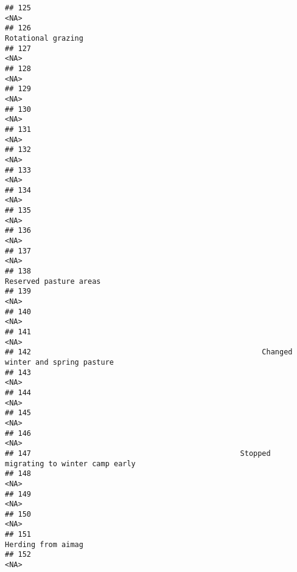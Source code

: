 \documentclass[
]{article}
\begin{document}
\begin{verbatim}
## 125                                                                                  <NA>
## 126                                                                    Rotational grazing
## 127                                                                                  <NA>
## 128                                                                                  <NA>
## 129                                                                                  <NA>
## 130                                                                                  <NA>
## 131                                                                                  <NA>
## 132                                                                                  <NA>
## 133                                                                                  <NA>
## 134                                                                                  <NA>
## 135                                                                                  <NA>
## 136                                                                                  <NA>
## 137                                                                                  <NA>
## 138                                                                Reserved pasture areas
## 139                                                                                  <NA>
## 140                                                                                  <NA>
## 141                                                                                  <NA>
## 142                                                     Changed winter and spring pasture
## 143                                                                                  <NA>
## 144                                                                                  <NA>
## 145                                                                                  <NA>
## 146                                                                                  <NA>
## 147                                                Stopped migrating to winter camp early
## 148                                                                                  <NA>
## 149                                                                                  <NA>
## 150                                                                                  <NA>
## 151                                                                    Herding from aimag
## 152                                                                                  <NA>

\end{verbatim}
\end{document}
